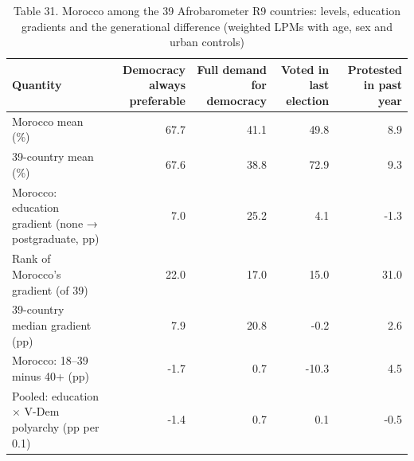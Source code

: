 \begin{table}
\caption{Table 31. Morocco among the 39 Afrobarometer R9 countries: levels, education gradients and the generational difference (weighted LPMs with age, sex and urban controls)}
\label{tab:T31_afro_comparative}
\begin{tabular}{lrrrr}
\toprule
Quantity & Democracy always preferable & Full demand for democracy & Voted in last election & Protested in past year \\
\midrule
Morocco mean (\%) & 67.7 & 41.1 & 49.8 & 8.9 \\
39-country mean (\%) & 67.6 & 38.8 & 72.9 & 9.3 \\
Morocco: education gradient (none → postgraduate, pp) & 7.0 & 25.2 & 4.1 & -1.3 \\
Rank of Morocco's gradient (of 39) & 22.0 & 17.0 & 15.0 & 31.0 \\
39-country median gradient (pp) & 7.9 & 20.8 & -0.2 & 2.6 \\
Morocco: 18–39 minus 40+ (pp) & -1.7 & 0.7 & -10.3 & 4.5 \\
Pooled: education × V-Dem polyarchy (pp per 0.1) & -1.4 & 0.7 & 0.1 & -0.5 \\
\bottomrule
\end{tabular}
\end{table}
